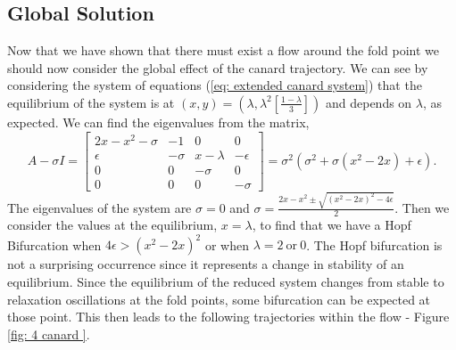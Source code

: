\subsection{Global Solution}\label{sec:effect-of-the-canard-point}
Now that we have shown that there must exist a flow around the fold point we should now consider the global effect of the canard trajectory. We can see by considering the  system of equations (\ref{eq: extended canard system}) that the equilibrium of the system is at $ (x,y)=(\lambda,\lambda^2[\frac{1-\lambda}{3}]) $  and depends on $\lambda$, as expected. We can find the eigenvalues from the matrix, 
\begin{equation}
A-\sigma I=\begin{bmatrix}
2x-x^2-\sigma&-1&0&0\\
\epsilon&-\sigma&x-\lambda&-\epsilon\\
0&0&-\sigma&0\\
0&0&0&-\sigma
\end{bmatrix}=\sigma^2(\sigma^2+\sigma(x^2-2x)+\epsilon).
\end{equation}
The eigenvalues of the system are $ \sigma=0 $ and $ \sigma=\frac{2x-x^2\pm\sqrt{(x^2-2x)^2-4\epsilon}}{2} $. Then we consider the values at the equilibrium, $ x=\lambda $, to find that we have a Hopf Bifurcation when $ 4\epsilon>(x^2-2x)^2 $ or when $ \lambda=2 \ \text{or} \ 0 $. The Hopf bifurcation is not a surprising occurrence since it represents a change in stability of an equilibrium. Since the equilibrium of the reduced system changes from stable to relaxation oscillations at the fold points, some bifurcation can be expected at those point.
 This then leads to the following trajectories within the flow - Figure \ref{fig: 4 canard }.

